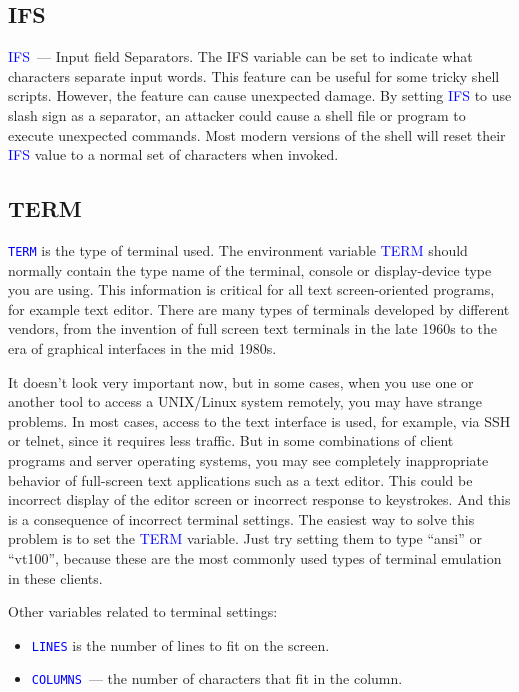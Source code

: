 \documentclass[12pt]{report}
\newcommand{\struct}[1]{\textcolor{blue}{#1}}
\newcommand{\cmd}[1]{\textcolor{blue}{#1}}
\begin{document}
\subsection*{IFS}

\cmd{IFS}~--- Input field Separators. The IFS variable can be set
to indicate what characters separate input words. This feature can be useful
for some tricky shell scripts. However, the feature can cause unexpected damage.
By setting \cmd{IFS} to use slash sign as a separator, an attacker could cause
a shell file or program to execute unexpected commands. Most modern versions of
the shell will reset their \cmd{IFS} value to a normal set of characters
when invoked.

\subsection*{TERM}

\struct{\tt TERM} is the type of terminal used. The environment variable
\cmd{TERM} should normally contain the type name of the terminal, console or
display-device type you are using. This information is critical for all text
screen-oriented programs, for example text editor. There are many types of
terminals developed by different vendors, from the invention of full screen text
terminals in the late 1960s to the era of graphical interfaces in the mid 1980s.

\medskip
It doesn't look very important now, but in some cases, when you use one
or another tool to access a UNIX/Linux system remotely, you may have
strange problems. In most cases, access to the text interface is used,
for example, via SSH or telnet, since it requires less traffic.
But in some combinations of client programs and server operating systems,
you may see completely inappropriate behavior of full-screen text applications
such as a text editor. This could be incorrect display of the editor screen or
incorrect response to keystrokes. And this is a consequence of incorrect
terminal settings. The easiest way to solve this problem is to set
the \cmd{TERM} variable. Just try setting them to type ``ansi'' or ``vt100'',
because these are the most commonly used types of terminal emulation in these
clients.

\medskip
Other variables related to terminal settings:
\begin{itemize}
\item \struct{\tt LINES} is the number of lines to fit on the screen.
\item \struct{\tt COLUMNS}~--- the number of characters that fit in the column.
\end{itemize}
\end{document}
